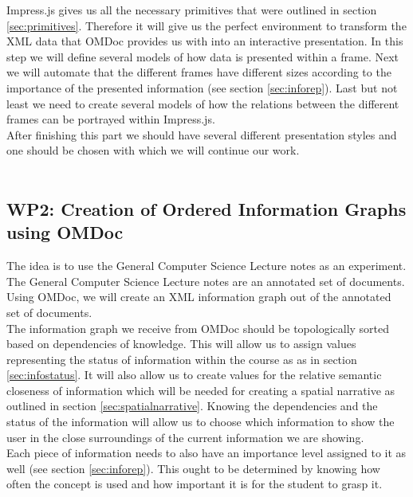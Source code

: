 \documentclass[twoside]{article}
\begin{document}
Impress.js gives us all the necessary primitives that were outlined in section \ref{sec:primitives}. Therefore it will give us the perfect environment to transform the XML data that OMDoc provides us with into an interactive presentation. In this step we will define several models of how data is presented within a frame. Next we will automate that the different frames have different sizes according to the importance of the presented information (see section \ref{sec:inforep}). Last but not least we need to create several models of how the relations between the different frames can be portrayed within Impress.js.\\

After finishing this part we should have several different presentation styles and one should be chosen with which we will continue our work.\\ 

\\

\subsection{WP2: Creation of Ordered Information Graphs using OMDoc}
\label{sec:wp2}

The idea is to use the General Computer Science Lecture notes \cite{Kohlhase:GenCSI:base} as an experiment. The General Computer Science Lecture notes are an annotated set of documents. Using OMDoc, we will create an XML information graph out of the annotated set of documents.\\

The information graph we receive from OMDoc should be topologically sorted based on dependencies of knowledge. This will allow us to assign values representing the status of information within the course as as in section \ref{sec:infostatus}. It will also allow us to create values for the relative semantic closeness of information which will be needed for creating a spatial narrative as outlined in section \ref{sec:spatialnarrative}. Knowing the dependencies and the status of the information will allow us to choose which information to show the user in the close surroundings of the current information we are showing.\\

Each piece of information needs to also have an importance level assigned to it as well (see section \ref{sec:inforep}). This ought to be determined by knowing how often the concept is used and how important it is for the student to grasp it.\\
\end{document}
